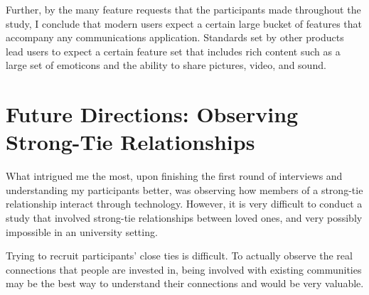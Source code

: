 	Further, by the many feature requests that the participants made throughout
	the study, I conclude that modern users expect a certain
	large bucket of features that accompany any communications application.
	Standards set by other products lead users to expect
	a certain feature set that includes rich content such as
	a large set of emoticons and the ability to share pictures, video, and sound.
  
\section{Future Directions: Observing Strong-Tie Relationships}
  What intrigued me the most, upon finishing the first round of interviews
	and understanding my participants better,
	was observing how members of a strong-tie relationship interact through
	technology.
	However,
	it is very difficult to conduct a study that involved strong-tie relationships
	between loved ones, and very possibly impossible in an university setting.

	Trying to recruit participants' close ties is difficult.
	To actually observe the real connections that people are invested in,
	being involved with existing communities may be the best way
	to understand their connections
	and would be very valuable.
